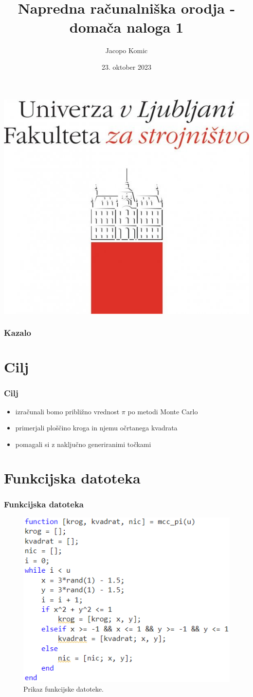 \documentclass{beamer}
\title{Napredna računalniška orodja - domača naloga 1}
\author{Jacopo Komic}
\institute{Univerza v Ljubljani - Fakulteta za strojništvo}
\date{23. oktober 2023}
\begin{document}
\begin{frame}
\begin{center}
\includegraphics[width = 0.2 \linewidth]{logotip.jpg}  
\end{center}
\titlepage
\end{frame}

\begin{frame}
\frametitle{Kazalo}
\tableofcontents
\end{frame}

\section{Cilj}
\begin{frame}
\frametitle{Cilj}

\begin{itemize}
  \item izračunali bomo približno vrednost $\pi$ po metodi Monte Carlo\pause
  \item primerjali ploščino kroga in njemu očrtanega kvadrata\pause
  \item pomagali si z naključno generiranimi točkami
\end{itemize}

\end{frame}

\section{Funkcijska datoteka}
\begin{frame}
\frametitle{Funkcijska datoteka}

\begin{figure}
  \centering
  \includegraphics[width = 0.6 \linewidth]{slika_1.png}
  \caption{Prikaz funkcijske datoteke.}
\end{figure}

\end{frame}
\end{document}
